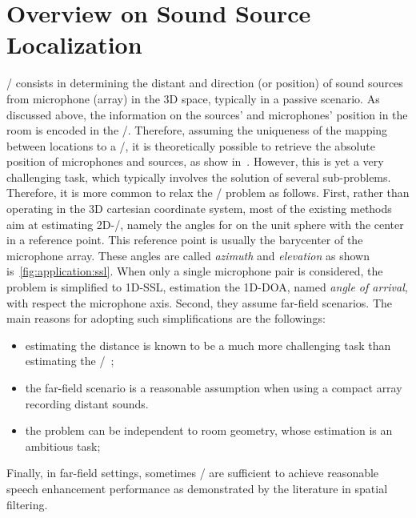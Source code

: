 \section{Overview on Sound Source Localization}\label{subsec:application:localization}
\SSLdef/ consists in determining the distant and direction (or position) of sound sources from microphone (array) in the 3D space, typically in a passive scenario.
As discussed above, the information on the sources' and microphones' position in the room is encoded in the \RIRs/.
Therefore, assuming the uniqueness of the mapping between locations to a \RIR/, it is theoretically possible to retrieve the absolute position of microphones and sources, as show in~.
However,  this is yet a very challenging task, which typically involves the solution of several sub-problems.
Therefore, it is more common to relax the \SSL/ problem as follows.
First, rather than operating in the  3D cartesian coordinate system, most of the existing methods aim at estimating 2D-\DOAdef/, namely the angles for on the unit sphere with the center in a reference point.
This reference point is usually the barycenter of the microphone array.
These angles are called \textit{azimuth} and \textit{elevation} as shown is~\cref{fig:application:ssl}.
When only a single microphone pair is considered, the problem is simplified to 1D-\ac{SSL}, estimation the 1D-\ac{DOA}, named \textit{angle of arrival}, with respect the microphone axis.
Second, they assume far-field scenarios.
The main reasons for adopting such simplifications are the followings:
\begin{itemize}
    \item estimating the distance is known to be a much more challenging task than estimating the \DOAs/~;
    \item the far-field scenario is a reasonable assumption when using a compact array recording distant sounds.
    \item the problem can be independent to room geometry, whose estimation is an ambitious task;
\end{itemize}
Finally, in far-field settings, sometimes \DOAs/ are sufficient to achieve reasonable speech enhancement performance as demonstrated by the literature in spatial filtering.


